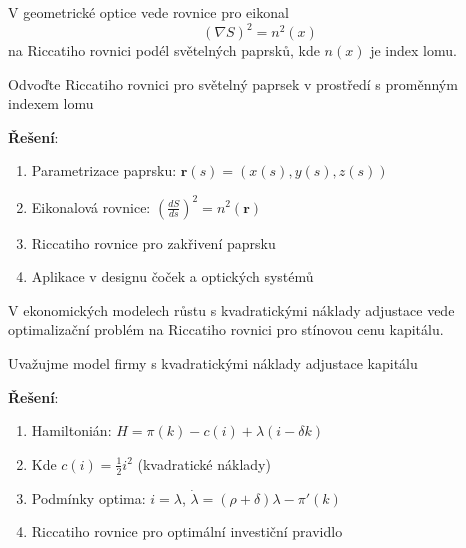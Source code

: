 \vspace{0.8\baselineskip}

\begin{application}
\label{app:wave-optics}
V geometrické optice vede rovnice pro eikonal
\[
(\nabla S)^2 = n^2(x)
\]
na Riccatiho rovnici podél světelných paprsků, kde $n(x)$ je index lomu.
\end{application}

\vspace{0.6\baselineskip}

\begin{example}
\label{ex:optics-riccati}
Odvoďte Riccatiho rovnici pro světelný paprsek v prostředí s proměnným indexem lomu

\textbf{Řešení}:
\begin{enumerate}
\item Parametrizace paprsku: $\mathbf{r}(s) = (x(s), y(s), z(s))$
\item Eikonalová rovnice: $\left(\frac{dS}{ds}\right)^2 = n^2(\mathbf{r})$
\item Riccatiho rovnice pro zakřivení paprsku
\item Aplikace v designu čoček a optických systémů
\end{enumerate}
\end{example}

\vspace{0.8\baselineskip}

\begin{application}
\label{app:economic-growth}
V ekonomických modelech růstu s kvadratickými náklady adjustace vede optimalizační problém na Riccatiho rovnici pro stínovou cenu kapitálu.
\end{application}

\vspace{0.6\baselineskip}

\begin{example}
\label{ex:economics-riccati}
Uvažujme model firmy s kvadratickými náklady adjustace kapitálu

\textbf{Řešení}:
\begin{enumerate}
\item Hamiltonián: $H = \pi(k) - c(i) + \lambda (i - \delta k)$
\item Kde $c(i) = \frac{1}{2} i^2$ (kvadratické náklady)
\item Podmínky optima: $i = \lambda$, $\dot{\lambda} = (\rho + \delta)\lambda - \pi'(k)$
\item Riccatiho rovnice pro optimální investiční pravidlo
\end{enumerate}
\end{example}

